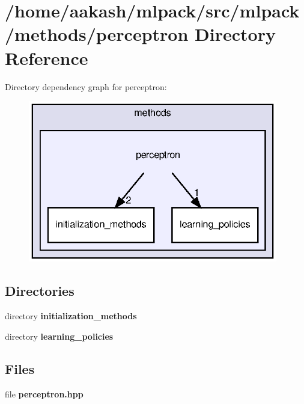 \section{/home/aakash/mlpack/src/mlpack/methods/perceptron Directory Reference}
\label{dir_bf4201a1cff29d7e18935cf6aeb09d34}
Directory dependency graph for perceptron\+:
\nopagebreak
\begin{figure}[H]
\begin{center}
\leavevmode
\includegraphics[width=309pt]{dir_bf4201a1cff29d7e18935cf6aeb09d34_dep}
\end{center}
\end{figure}
\subsection*{Directories}
\begin{DoxyCompactItemize}
\item 
directory \textbf{ initialization\+\_\+methods}
\item 
directory \textbf{ learning\+\_\+policies}
\end{DoxyCompactItemize}
\subsection*{Files}
\begin{DoxyCompactItemize}
\item 
file \textbf{ perceptron.\+hpp}
\end{DoxyCompactItemize}
